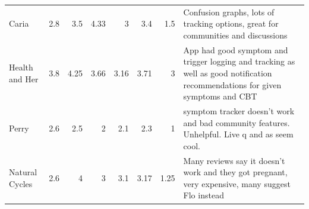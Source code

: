 \begin{table}[h!!]
\begin{tabular}{lrrrr
            >{\columncolor[HTML]{EFEFEF}}r 
            >{\columncolor[HTML]{EFEFEF}}r l}
                Caria                        & 2.8                                     & 3.5                                        & 4.33                                    & 3                                        & 3.4                                                              & 1.5                                                             & Confusion graphs, lots of tracking options, great for communities and discussions                                                                                                                                                                                                                                                                                                          \\
                Health and Her               & 3.8                                     & 4.25                                       & 3.66                                    & 3.16                                     & 3.71                                                             & 3                                                               & App had good symptom and trigger logging and tracking as well as good notification recommendations for given symptoms and CBT                                                                                                                                                                                                                                                              \\
                Perry                        & 2.6                                     & 2.5                                        & 2                                       & 2.1                                      & 2.3                                                              & 1                                                               & symptom tracker doesn’t work and bad community features. Unhelpful. Live q and as seem cool.                                                                                                                                                                                                                                                                                               \\
                Natural Cycles               & 2.6                                     & 4                                          & 3                                       & 3.1                                      & 3.17                                                             & 1.25                                                            & Many reviews say it doesn't work and they got pregnant, very expensive, many suggest Flo instead                                                                                                                                                                                                                                                                                           \\

\end{tabular}
\end{table}
